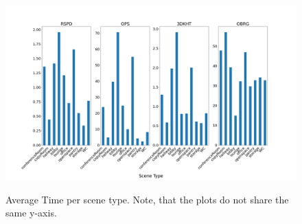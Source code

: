 \documentclass[main.tex]{subfiles}
\begin{document}
\begin{figure}[H]
    \centering
    \includegraphics[width=15 cm]{images/time_total.png}
    \label{fig:time_s3dis}
    \caption[Time Results S3DIS]{Average Time per scene type. Note, that the plots
    do not share the same y-axis.}
\end{figure}





\end{document}
